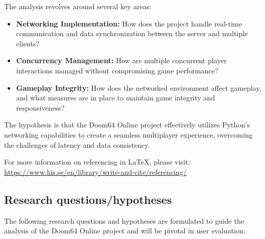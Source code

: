 The analysis revolves around several key areas:

\begin{itemize}
    \item \textbf{Networking Implementation:} How does the project handle real-time communication and data synchronization between the server and multiple clients?
    \item \textbf{Concurrency Management:} How are multiple concurrent player interactions managed without compromising game performance?
    \item \textbf{Gameplay Integrity:} How does the networked environment affect gameplay, and what measures are in place to maintain game integrity and responsiveness?
\end{itemize}

The hypothesis is that the Doom64 Online project effectively utilizes Python's networking capabilities to create a seamless multiplayer experience, overcoming the challenges of latency and data consistency.

For more information on referencing in LaTeX, please visit: \url{https://www.his.se/en/library/write-and-cite/referencing/}


\subsection{Research questions/hypotheses}
\label{sec:question}

The following research questions and hypotheses are formulated to guide the analysis of the Doom64 Online project and will be pivotal in user evaluation:

